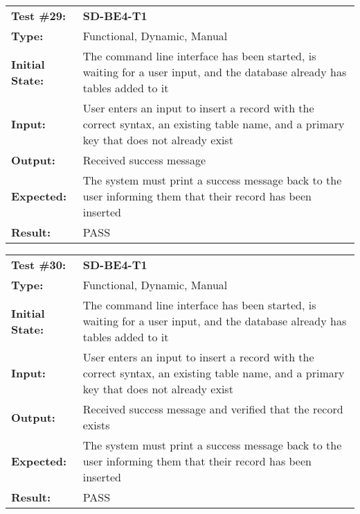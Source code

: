 \documentclass[12pt, titlepage]{article}
\begin{document}
\begin{mdframed}[linewidth=1pt]
\begin{tabularx}{\textwidth}{@{}p{3cm}X@{}}
{\bf Test \#29:} & {\bf SD-BE4-T1}\\[\baselineskip]
{\bf Type:} & Functional, Dynamic, Manual \\[0.5\baselineskip]
{\bf Initial State:} & The command line interface has been started, is waiting for a user input, and the database already has tables added to it \\[\baselineskip]
{\bf Input:} & User enters an input to insert a record with the correct syntax, an existing table name, and a primary key that does not already exist \\[\baselineskip]
{\bf Output:} & Received success message \\[\baselineskip]
{\bf Expected:} & The system must print a success message back to the user informing them that their record has been inserted \\[\baselineskip]
{\bf Result:} & PASS
\end{tabularx}
\end{mdframed} 

\begin{mdframed}[linewidth=1pt]
\begin{tabularx}{\textwidth}{@{}p{3cm}X@{}}
{\bf Test \#30:} & {\bf SD-BE4-T1}\\[\baselineskip]
{\bf Type:} & Functional, Dynamic, Manual \\[0.5\baselineskip]
{\bf Initial State:} & The command line interface has been started, is waiting for a user input, and the database already has tables added to it \\[\baselineskip]
{\bf Input:} & User enters an input to insert a record with the correct syntax, an existing table name, and a primary key that does not already exist \\[\baselineskip]
{\bf Output:} & Received success message and verified that the record exists \\[\baselineskip]
{\bf Expected:} & The system must print a success message back to the user informing them that their record has been inserted \\[\baselineskip]
{\bf Result:} & PASS
\end{tabularx}
\end{mdframed} 
\end{document}
